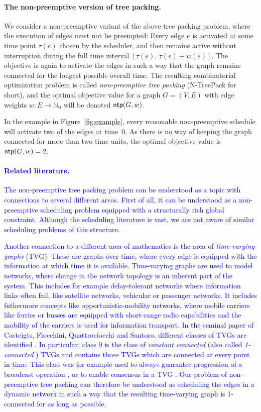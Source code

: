 \documentclass[runningheads]{llncs}
\newcommand{\NN}{\mathbb{N}}
\newcommand{\xxxNTP}{{\sc N-TreePack}}
\DeclareMathOperator{\ntp}{\text{\sf ntp}}
\newcommand{\lasse}[1]{\textcolor{blue}{#1}}
\begin{document}
\paragraph{The non-preemptive version of tree packing.}
We consider a non-preemptive variant of the above tree packing problem,
where the execution of edges must not be preempted: 
Every edge $e$ is activated at some time point $\tau(e)$ chosen by the scheduler, and then 
remains active without interruption during the full time interval $[\tau(e),\,\tau(e)+w(e)]$.
The objective is again to activate the edges in such a way that the graph
remains connected for the longest possible overall time.
The resulting combinatorial optimization problem is called \emph{non-preemptive tree packing}
({\xxxNTP} for short), and the optimal objective value for a graph $G=(V,E)$ with edge 
weights $w:E\to\NN_0$ will be denoted $\ntp(G,w)$.

In the example in Figure~\ref{fig:example}, every reasonable non-preemptive
schedule will activate two of the edges at time~$0$.
As there is no way of keeping the graph connected for more than two time units, 
the optimal objective value is $\ntp(G,w)=2$.

\lasse{\paragraph{Related literature.}
The non-preemptive tree packing problem can be understood as a topic with connections to several different areas. First of all, it can be understood as a non-preemptive scheduling problem equipped with a structurally rich global constraint. Although the scheduling literature is vast, we are not aware of similar scheduling problems of this structure.
}

\lasse{Another connection to a different area of mathematics is the area of \emph{time-varying graphs} (TVG). These are graphs over time, where every edge is equipped with the information at which time it is available.
Time-varying graphs are used to model networks, where change in the network topology is an inherent part of the system. 
This includes for example delay-tolerant networks where information links often fail, like satellite networks, vehicular or passenger networks.
 It includes futhermore concepts like opportunistic-mobility networks, where mobile carriers like ferries or busses are equipped with short-range radio capabilities and the mobility of the carriers is used for information transport. 
 In the seminal paper of Casteigts, Flocchini, Quattrociocchi and Santoro, different classes of TVGs are identified \cite{time-varying-graphs}. 
 In particular, class 9 is the class of \emph{constant connected} (also called \emph{1-connected} \cite{B-connected-1}) TVGs and contains those TVGs which are connected at every point in time. 
 This class was for example used to always guarantee progression of a broadcast operation \cite{o2005information}, or to enable consensus in a TVG \cite{kuhn2011coordinated}. Our problem of non-preemptive tree packing can therefore be understood as scheduling the edges in a dynamic network in such a way that the resulting time-varying graph is 1-connected 
 for as long as possible.}
 
\end{document}
